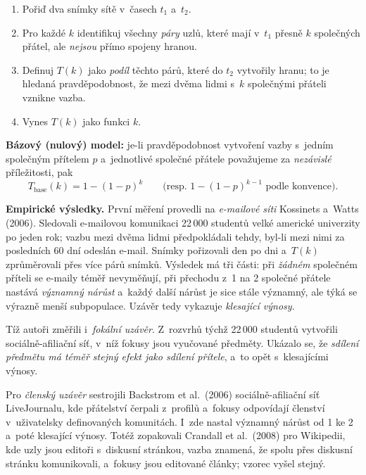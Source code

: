 \documentclass[11pt,a4paper]{article}
\theoremstyle{definition}
\begin{document}
\begin{defbox}
\begin{enumerate}
\item Pořiď dva snímky sítě v~časech $t_1$ a~$t_2$.
\item Pro každé $k$ identifikuj všechny \emph{páry} uzlů, které mají v~$t_1$ přesně $k$
      společných přátel, ale \emph{nejsou} přímo spojeny hranou.
\item Definuj $T(k)$ jako \emph{podíl} těchto párů, které do $t_2$ vytvořily hranu; to je
      hledaná pravděpodobnost, že mezi dvěma lidmi s~$k$ společnými přáteli vznikne vazba.
\item Vynes $T(k)$ jako funkci $k$.
\end{enumerate}

\textbf{Bázový (nulový) model:} je-li pravděpodobnost vytvoření vazby s~jedním společným
přítelem $p$ a~jednotlivé společné přátele považujeme za \emph{nezávislé} příležitosti, pak
\[ T_{\text{base}}(k)=1-(1-p)^{k}\qquad\text{(resp.\ }1-(1-p)^{k-1}\text{ podle konvence).} \]
\end{defbox}

\textbf{Empirické výsledky.} První měření provedli na \emph{e-mailové síti} Kossinets a~Watts
(2006). Sledovali e-mailovou komunikaci 22\,000 studentů velké americké univerzity po jeden
rok; vazbu mezi dvěma lidmi předpokládali tehdy, byl-li mezi nimi za posledních 60 dní odeslán
e-mail. Snímky pořizovali den po dni a~$T(k)$ zprůměrovali přes více párů snímků. Výsledek má
tři části: při \emph{žádném} společném příteli se e-maily téměř nevyměňují, při přechodu z~1 na
2 společné přátele nastává \emph{významný nárůst} a~každý další nárůst je sice stále významný,
ale týká se výrazně menší subpopulace. Uzávěr tedy vykazuje \emph{klesající výnosy}.

Tíž autoři změřili i~\emph{fokální uzávěr}. Z~rozvrhů týchž 22\,000 studentů vytvořili
sociálně-afiliační síť, v~níž fokusy jsou vyučované předměty. Ukázalo se, že \emph{sdílení
předmětu má téměř stejný efekt jako sdílení přítele}, a~to opět s~klesajícími výnosy.

Pro \emph{členský uzávěr} sestrojili Backstrom et al.\ (2006) sociálně-afiliační síť
LiveJournalu, kde přátelství čerpali z~profilů a~fokusy odpovídají členství v~uživatelsky
definovaných komunitách. I~zde nastal významný nárůst od 1 ke 2 a~poté klesající výnosy. Totéž
zopakovali Crandall et al.\ (2008) pro Wikipedii, kde uzly jsou editoři s~diskusní stránkou,
vazba znamená, že spolu přes diskusní stránku komunikovali, a~fokusy jsou editované články;
vzorec vyšel stejný.
\end{document}
